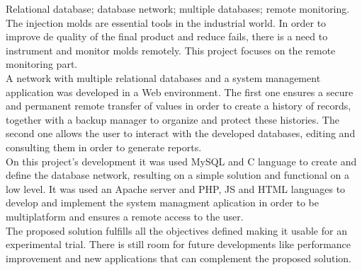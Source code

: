 \documentclass[11pt,twoside,a4paper]{report}
\begin{document}
\TitlePage
  \vspace*{55mm}
  {Relational database; database network; multiple databases; remote monitoring.}
  {The injection molds are essential tools in the industrial world. In order to improve de quality of the final product and reduce fails, there is a need to instrument and monitor molds remotely. This project focuses on the remote monitoring part.\\
  A network with multiple relational databases and a system management application was developed in a Web environment. The first one ensures a secure and permanent remote transfer of values in order to create a history of records, together with a backup manager to organize and protect these histories. The second one allows the user to interact with the developed databases, editing and consulting them in order to generate reports.\\
  On this project's development it was used MySQL and C language to create and define the database network, resulting on a simple solution and functional on a low level. It was used an Apache server and PHP, JS and HTML languages to develop and implement the system managment aplication in order to be multiplatform and ensures a remote access to the user.\\
  The proposed solution fulfills all the objectives defined making it usable for an experimental trial. There is still room for future developments like performance improvement and new applications that can complement the proposed solution.}
\EndTitlePage
\titlepage\ \endtitlepage %


%
%

\tableofcontents

\cleardoublepage
\listoffigures

\cleardoublepage
\listoftables


\end{document}

